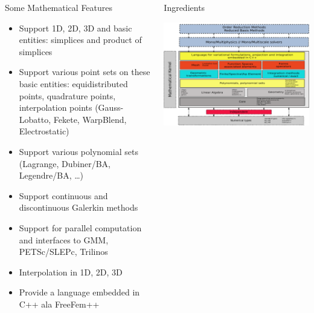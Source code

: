 \documentclass[final,utf8,,hyperref={pdfpagelabels=false}]{beamer}
\begin{document}
\begin{frame}[containsverbatim]{}
\begin{columns}[c]
    \begin{block}{Some Mathematical Features}
      \begin{itemize}
      \item Support 1D, 2D, 3D and basic entities: simplices and product of simplices
      \item Support various point sets on these basic entities: equidistributed
        points, quadrature points, interpolation points (Gauss-Lobatto, Fekete,
        WarpBlend, Electrostatic)
      \item Support various polynomial sets (Lagrange, Dubiner/BA, Legendre/BA,
        \dots)
      \item Support continuous and discontinuous Galerkin methods
      \item Support for parallel computation and interfaces to GMM, PETSc/SLEPc,
        Trilinos
      \item Interpolation in 1D, 2D, 3D
      \item Provide a language embedded in C++ ala FreeFem++
      \end{itemize}
    \end{block}

    \begin{block}{Ingredients}
      \centerline{\includegraphics[width=\linewidth]{arch2.pdf}}
    \end{block}
    \vfill


\end{columns}
\end{frame}
\end{document}
